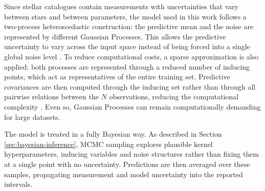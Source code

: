 Since stellar catalogues contain measurements with uncertainties that vary between stars and between parameters, the model used in this work follows a two-process heteroscedastic construction: the predictive mean and the noise are represented by different Gaussian Processes. This allows the predictive uncertainty to vary across the input space instead of being forced into a single global noise level \citep{le2005heteroscedasticgp}. To reduce computational costs, a sparse approximation is also applied: both processes are represented through a reduced number of inducing points, which act as representatives of the entire training set. Predictive covariances are then computed through the inducing set rather than through all pairwise relations between the $N$ observations, reducing the computational complexity \citep{quinonero2005sparsegp}. Even so, Gaussian Processes can remain computationally demanding for large datasets.

The model is treated in a fully Bayesian way. As described in Section \ref{sec:bayesian-inference}, MCMC sampling explores plausible kernel hyperparameters, inducing variables and noise structures rather than fixing them at a single point with no uncertainty. Predictions are then averaged over these samples, propagating measurement and model uncertainty into the reported intervals.





